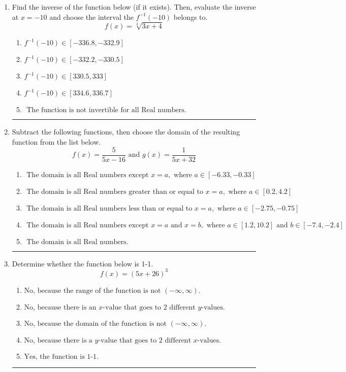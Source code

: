 \documentclass[14pt]{extbook}
\newcommand{\litem}[1]{\item#1\hspace*{-1cm}\rule{\textwidth}{0.4pt}}
\begin{document}
\begin{enumerate}
\litem{
Find the inverse of the function below (if it exists). Then, evaluate the inverse at $x = -10$ and choose the interval the $f^{-1}(-10)$ belongs to.\[ f(x) = \sqrt[3]{3 x + 4} \]\begin{enumerate}[label=\Alph*.]
\item \( f^{-1}(-10) \in [-336.8, -332.9] \)
\item \( f^{-1}(-10) \in [-332.2, -330.5] \)
\item \( f^{-1}(-10) \in [330.5, 333] \)
\item \( f^{-1}(-10) \in [334.6, 336.7] \)
\item \( \text{ The function is not invertible for all Real numbers. } \)

\end{enumerate} }
\litem{
Subtract the following functions, then choose the domain of the resulting function from the list below.\[ f(x) = \frac{5}{5x-16} \text{ and } g(x) = \frac{1}{5x+32} \]\begin{enumerate}[label=\Alph*.]
\item \( \text{ The domain is all Real numbers except } x = a, \text{ where } a \in [-6.33, -0.33] \)
\item \( \text{ The domain is all Real numbers greater than or equal to } x = a, \text{ where } a \in [0.2, 4.2] \)
\item \( \text{ The domain is all Real numbers less than or equal to } x = a, \text{ where } a \in [-2.75, -0.75] \)
\item \( \text{ The domain is all Real numbers except } x = a \text{ and } x = b, \text{ where } a \in [1.2, 10.2] \text{ and } b \in [-7.4, -2.4] \)
\item \( \text{ The domain is all Real numbers. } \)

\end{enumerate} }
\litem{
Determine whether the function below is 1-1.\[ f(x) = (5 x + 26)^3 \]\begin{enumerate}[label=\Alph*.]
\item \( \text{No, because the range of the function is not $(-\infty, \infty)$.} \)
\item \( \text{No, because there is an $x$-value that goes to 2 different $y$-values.} \)
\item \( \text{No, because the domain of the function is not $(-\infty, \infty)$.} \)
\item \( \text{No, because there is a $y$-value that goes to 2 different $x$-values.} \)
\item \( \text{Yes, the function is 1-1.} \)


\end{enumerate}}
\end{enumerate}
\end{document}
